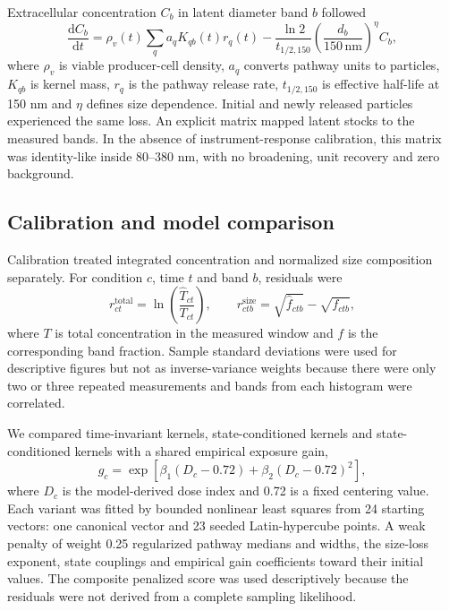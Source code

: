 Extracellular concentration $C_b$ in latent diameter band $b$ followed
\begin{equation}
\frac{\mathrm dC_b}{\mathrm dt}=\rho_v(t)\sum_q a_qK_{qb}(t)r_q(t)-\frac{\ln2}{t_{1/2,150}}\left(\frac{d_b}{150\,\mathrm{nm}}\right)^\eta C_b,
\end{equation}
where $\rho_v$ is viable producer-cell density, $a_q$ converts pathway units to particles, $K_{qb}$ is kernel mass, $r_q$ is the pathway release rate, $t_{1/2,150}$ is effective half-life at 150 nm and $\eta$ defines size dependence. Initial and newly released particles experienced the same loss. An explicit matrix mapped latent stocks to the measured bands. In the absence of instrument-response calibration, this matrix was identity-like inside 80--380 nm, with no broadening, unit recovery and zero background.

\subsection*{Calibration and model comparison}

Calibration treated integrated concentration and normalized size composition separately. For condition $c$, time $t$ and band $b$, residuals were
\begin{equation}
r^{\mathrm{total}}_{ct}=\ln\left(\frac{\widehat T_{ct}}{T_{ct}}\right),\qquad
r^{\mathrm{size}}_{ctb}=\sqrt{\widehat f_{ctb}}-\sqrt{f_{ctb}},
\end{equation}
where $T$ is total concentration in the measured window and $f$ is the corresponding band fraction. Sample standard deviations were used for descriptive figures but not as inverse-variance weights because there were only two or three repeated measurements and bands from each histogram were correlated.

We compared time-invariant kernels, state-conditioned kernels and state-conditioned kernels with a shared empirical exposure gain,
\begin{equation}
g_c=\exp[\beta_1(D_c-0.72)+\beta_2(D_c-0.72)^2],
\end{equation}
where $D_c$ is the model-derived dose index and 0.72 is a fixed centering value. Each variant was fitted by bounded nonlinear least squares from 24 starting vectors: one canonical vector and 23 seeded Latin-hypercube points. A weak penalty of weight 0.25 regularized pathway medians and widths, the size-loss exponent, state couplings and empirical gain coefficients toward their initial values. The composite penalized score was used descriptively because the residuals were not derived from a complete sampling likelihood.

